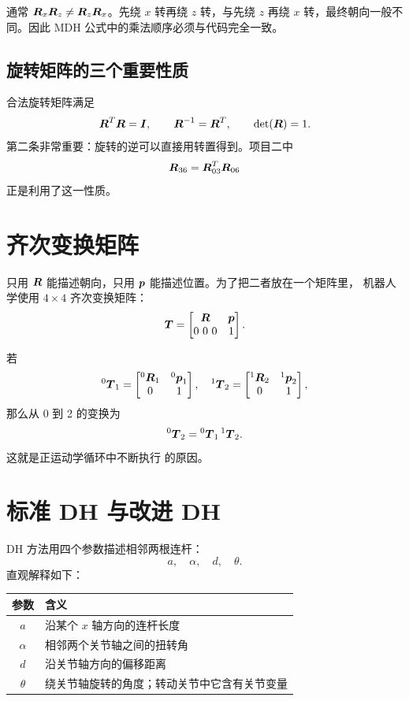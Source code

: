 \begin{warningbox}[矩阵乘法的顺序不能交换]
通常 $\boldsymbol{R}_x\boldsymbol{R}_z\ne\boldsymbol{R}_z\boldsymbol{R}_x$。先绕 $x$ 转再绕 $z$ 转，与先绕 $z$
再绕 $x$ 转，最终朝向一般不同。因此 MDH 公式中的乘法顺序必须与代码完全一致。
\end{warningbox}

\subsection{旋转矩阵的三个重要性质}

合法旋转矩阵满足
\[
\boldsymbol{R}^T\boldsymbol{R}=\boldsymbol{I},\qquad
\boldsymbol{R}^{-1}=\boldsymbol{R}^T,\qquad
\det(\boldsymbol{R})=1.
\]
第二条非常重要：旋转的逆可以直接用转置得到。项目二中
\[
\boldsymbol{R}_{36}=\boldsymbol{R}_{03}^T\boldsymbol{R}_{06}
\]
正是利用了这一性质。

\section{齐次变换矩阵}

只用 $\boldsymbol{R}$ 能描述朝向，只用 $\boldsymbol{p}$ 能描述位置。为了把二者放在一个矩阵里，
机器人学使用 $4\times4$ 齐次变换矩阵：
\[
\boldsymbol{T}=
\begin{bmatrix}
\boldsymbol{R}&\boldsymbol{p}\\
0\ 0\ 0&1
\end{bmatrix}.
\]

若
\[
{}^0\boldsymbol{T}_1=
\begin{bmatrix}{}^0\boldsymbol{R}_1&{}^0\boldsymbol{p}_1\\0&1\end{bmatrix},\quad
{}^1\boldsymbol{T}_2=
\begin{bmatrix}{}^1\boldsymbol{R}_2&{}^1\boldsymbol{p}_2\\0&1\end{bmatrix},
\]
那么从 0 到 2 的变换为
\[
{}^0\boldsymbol{T}_2={}^0\boldsymbol{T}_1\,{}^1\boldsymbol{T}_2.
\]
这就是正运动学循环中不断执行  的原因。

\section{标准 DH 与改进 DH}

DH 方法用四个参数描述相邻两根连杆：
\[
a,\quad \alpha,\quad d,\quad \theta.
\]
直观解释如下：

\begin{table}[H]
\centering
\begin{tabularx}{0.92\textwidth}{cX}
\toprule
参数 & 含义\\
\midrule
$a$ & 沿某个 $x$ 轴方向的连杆长度\\
$\alpha$ & 相邻两个关节轴之间的扭转角\\
$d$ & 沿关节轴方向的偏移距离\\
$\theta$ & 绕关节轴旋转的角度；转动关节中它含有关节变量\\
\bottomrule
\end{tabularx}
\end{table}

